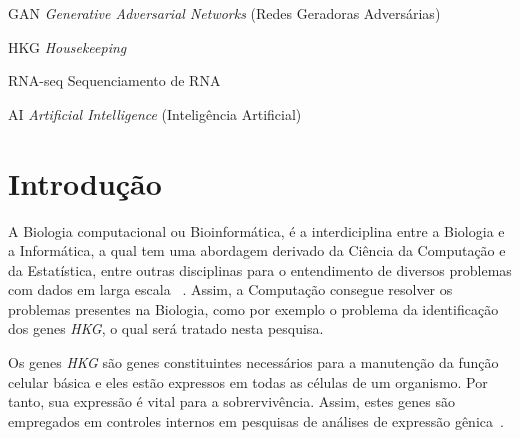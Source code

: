 \documentclass[
	12pt,				%
	openright,			%
	oneside,			%
	a4paper,			%
	english,			%
	brazil				%
	]{abntex2}
\begin{document}

\begin{siglas}
  \item[GAN] \textit{Generative Adversarial Networks} (Redes Geradoras Adversárias)
  \item[HKG] \textit{Housekeeping}
  \item[RNA-seq] Sequenciamento de RNA
  \item[AI] \textit{Artificial Intelligence} (Inteligência Artificial)
\end{siglas}



\tableofcontents*
\cleardoublepage
\textual

\chapter{Introdução}
A Biologia computacional ou Bioinformática, é a interdiciplina entre a Biologia e a Informática, a qual tem uma abordagem derivado da Ciência da Computação e da Estatística, entre outras disciplinas para o entendimento de diversos problemas com dados em larga escala ~\cite{MLuscombe}. Assim, a Computação consegue resolver os problemas presentes na Biologia, como por exemplo o problema da identificação dos genes \textit{HKG}, o qual será tratado nesta pesquisa.

Os genes \textit{HKG} são genes constituintes necessários para a manutenção da função celular básica e eles estão expressos em todas as células de um organismo. Por tanto, sua expressão é vital para a sobrervivência. Assim, estes genes são empregados em controles internos em pesquisas de análises de expressão gênica~\cite{valente2009selection}. 
\end{document}
